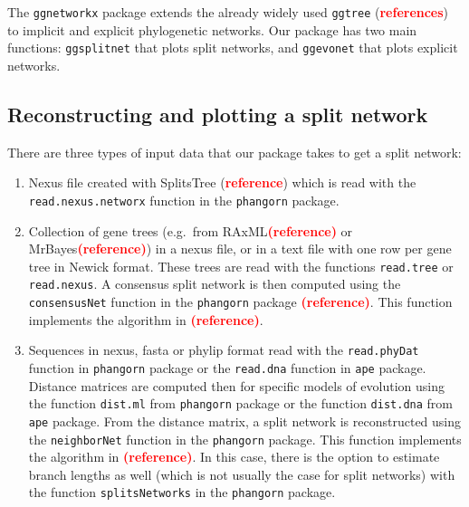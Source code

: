 \documentclass[]{IEEEtran}
\providecommand{\tightlist}{%
  \setlength{\itemsep}{0pt}\setlength{\parskip}{0pt}}
\begin{document}
The \texttt{ggnetworkx} package extends the already widely used
\texttt{ggtree} (\textcolor{red}{\textbf{references}}) to implicit and
explicit phylogenetic networks. Our package has two main functions:
\texttt{ggsplitnet} that plots split networks, and \texttt{ggevonet}
that plots explicit networks.

\vspace{-0.25cm}

\hypertarget{reconstructing-and-plotting-a-split-network}{%
\subsection{Reconstructing and plotting a split
network}\label{reconstructing-and-plotting-a-split-network}}

There are three types of input data that our package takes to get a
split network:

\begin{enumerate}
\def\labelenumi{\arabic{enumi}.}
\tightlist
\item
  Nexus file created with SplitsTree
  (\textcolor{red}{\textbf{reference}}) which is read with the
  \texttt{read.nexus.networx} function in the \texttt{phangorn} package.
\item
  Collection of gene trees (e.g.~from
  RAxML\textcolor{red}{\textbf{(reference)}} or
  MrBayes\textcolor{red}{\textbf{(reference)}}) in a nexus file, or in a
  text file with one row per gene tree in Newick format. These trees are
  read with the functions \texttt{read.tree} or \texttt{read.nexus}. A
  consensus split network is then computed using the
  \texttt{consensusNet} function in the \texttt{phangorn} package
  \textcolor{red}{\textbf{(reference)}}. This function implements the
  algorithm in \textcolor{red}{\textbf{(reference)}}.
\item
  Sequences in nexus, fasta or phylip format read with the
  \texttt{read.phyDat} function in \texttt{phangorn} package or the
  \texttt{read.dna} function in \texttt{ape} package. Distance matrices
  are computed then for specific models of evolution using the function
  \texttt{dist.ml} from \texttt{phangorn} package or the function
  \texttt{dist.dna} from \texttt{ape} package. From the distance matrix,
  a split network is reconstructed using the \texttt{neighborNet}
  function in the \texttt{phangorn} package. This function implements
  the algorithm in \textcolor{red}{\textbf{(reference)}}. In this case,
  there is the option to estimate branch lengths as well (which is not
  usually the case for split networks) with the function
  \texttt{splitsNetworks} in the \texttt{phangorn} package.
\end{enumerate}
\end{document}
